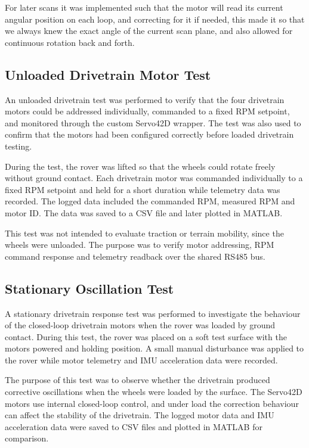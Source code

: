 For later scans it was implemented such that the motor will read its current angular position on each loop, and correcting for it if needed, this made it so that we always knew the exact angle of the current scan plane, and also allowed for continuous rotation back and forth.

\subsection{Unloaded Drivetrain Motor Test}
An unloaded drivetrain test was performed to verify that the four drivetrain motors could be addressed individually, commanded to a fixed RPM setpoint, and monitored through the custom Servo42D wrapper. The test was also used to confirm that the motors had been configured correctly before loaded drivetrain testing.

During the test, the rover was lifted so that the wheels could rotate freely without ground contact. Each drivetrain motor was commanded individually to a fixed RPM setpoint and held for a short duration while telemetry data was recorded. The logged data included the commanded RPM, measured RPM and motor ID. The data was saved to a CSV file and later plotted in MATLAB.

This test was not intended to evaluate traction or terrain mobility, since the wheels were unloaded. The purpose was to verify motor addressing, RPM command response and telemetry readback over the shared RS485 bus.

\subsection{Stationary Oscillation Test}
A stationary drivetrain response test was performed to investigate the behaviour of the closed-loop drivetrain motors when the rover was loaded by ground contact. During this test, the rover was placed on a soft test surface with the motors powered and holding position. A small manual disturbance was applied to the rover while motor telemetry and IMU acceleration data were recorded.

The purpose of this test was to observe whether the drivetrain produced corrective oscillations when the wheels were loaded by the surface. The Servo42D motors use internal closed-loop control, and under load the correction behaviour can affect the stability of the drivetrain. The logged motor data and IMU acceleration data were saved to CSV files and plotted in MATLAB for comparison.

